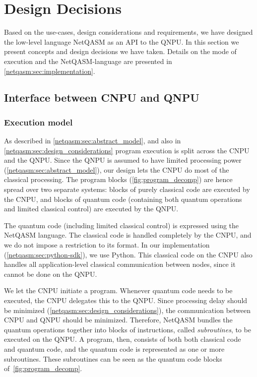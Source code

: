 \section{Design Decisions}
\label{netqasm:sec:design_decisions}


Based on the use-cases, design considerations and requirements, we have designed the low-level language \ac{NetQASM} as an API to the \ac{QNPU}.
In this section we present concepts and design decisions we have taken.
Details on the mode of execution and the \ac{NetQASM}-language are presented in \cref{netqasm:sec:implementation}.

\subsection{Interface between \ac{CNPU} and QNPU}
\label{netqasm:sec:design_decisions_interface}

\subsubsection{Execution model}
As described in \cref{netqasm:sec:abstract_model}, and also in \cref{netqasm:sec:design_considerations} program execution is split across the \ac{CNPU} and the \ac{QNPU}.
Since the \ac{QNPU} is assumed to have limited processing power (\cref{netqasm:sec:abstract_model}), our design lets the \ac{CNPU} do most of the classical processing.
The program blocks (\cref{fig:program_decomp}) are hence spread over two separate systems: blocks of purely classical code are executed by the \ac{CNPU}, and blocks of quantum code (containing both quantum operations and limited classical control) are executed by the \ac{QNPU}.

The quantum code (including limited classical control) is expressed using the \ac{NetQASM} language.
The classical code is handled completely by the \ac{CNPU}, and we do not impose a restriction to its format.
In our implementation (\cref{netqasm:sec:python-sdk}), we use Python.
This classical code on the \ac{CNPU} also handles all application-level classical communication between nodes, since it cannot be done on the \ac{QNPU}.

We let the \ac{CNPU} initiate a program.
Whenever quantum code needs to be executed, the \ac{CNPU} delegates this to the \ac{QNPU}.
Since processing delay should be minimized (\cref{netqasm:sec:design_considerations}), the communication between \ac{CNPU} and \ac{QNPU} should be minimized.
Therefore, \ac{NetQASM} bundles the quantum operations together into blocks of instructions, called \textit{subroutines}, to be executed on the \ac{QNPU}.
A program, then, consists of both both classical code and quantum code, and the quantum code is represented as one or more subroutines.
These subroutines can be seen as the quantum code blocks of~\cref{fig:program_decomp}.

